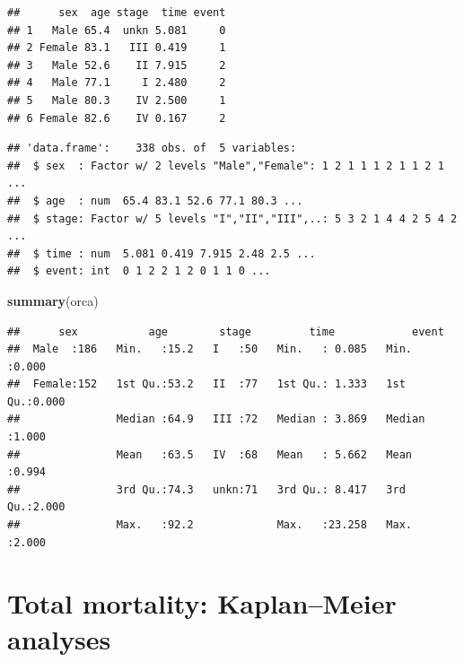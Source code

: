 \documentclass[
]{book}
\newenvironment{Shaded}{\begin{snugshade}}{\end{snugshade}}
\newcommand{\AttributeTok}[1]{\textcolor[rgb]{0.13,0.29,0.53}{#1}}
\newcommand{\FunctionTok}[1]{\textcolor[rgb]{0.13,0.29,0.53}{\textbf{#1}}}
\newcommand{\NormalTok}[1]{#1}
\newcommand{\OtherTok}[1]{\textcolor[rgb]{0.56,0.35,0.01}{#1}}
\newcommand{\SpecialCharTok}[1]{\textcolor[rgb]{0.81,0.36,0.00}{\textbf{#1}}}
\newcommand{\StringTok}[1]{\textcolor[rgb]{0.31,0.60,0.02}{#1}}
\begin{document}
\begin{verbatim}
##      sex  age stage  time event
## 1   Male 65.4  unkn 5.081     0
## 2 Female 83.1   III 0.419     1
## 3   Male 52.6    II 7.915     2
## 4   Male 77.1     I 2.480     2
## 5   Male 80.3    IV 2.500     1
## 6 Female 82.6    IV 0.167     2
\end{verbatim}

\begin{Shaded}
\end{Shaded}

\begin{verbatim}
## 'data.frame':    338 obs. of  5 variables:
##  $ sex  : Factor w/ 2 levels "Male","Female": 1 2 1 1 1 2 1 1 2 1 ...
##  $ age  : num  65.4 83.1 52.6 77.1 80.3 ...
##  $ stage: Factor w/ 5 levels "I","II","III",..: 5 3 2 1 4 4 2 5 4 2 ...
##  $ time : num  5.081 0.419 7.915 2.48 2.5 ...
##  $ event: int  0 1 2 2 1 2 0 1 1 0 ...
\end{verbatim}

\begin{Shaded}
\begin{Highlighting}[]
\FunctionTok{summary}\NormalTok{(orca)}
\end{Highlighting}
\end{Shaded}

\begin{verbatim}
##      sex           age        stage         time            event      
##  Male  :186   Min.   :15.2   I   :50   Min.   : 0.085   Min.   :0.000  
##  Female:152   1st Qu.:53.2   II  :77   1st Qu.: 1.333   1st Qu.:0.000  
##               Median :64.9   III :72   Median : 3.869   Median :1.000  
##               Mean   :63.5   IV  :68   Mean   : 5.662   Mean   :0.994  
##               3rd Qu.:74.3   unkn:71   3rd Qu.: 8.417   3rd Qu.:2.000  
##               Max.   :92.2             Max.   :23.258   Max.   :2.000
\end{verbatim}

\section{Total mortality: Kaplan--Meier analyses}\label{total-mortality-kaplanmeier-analyses}
\end{document}
